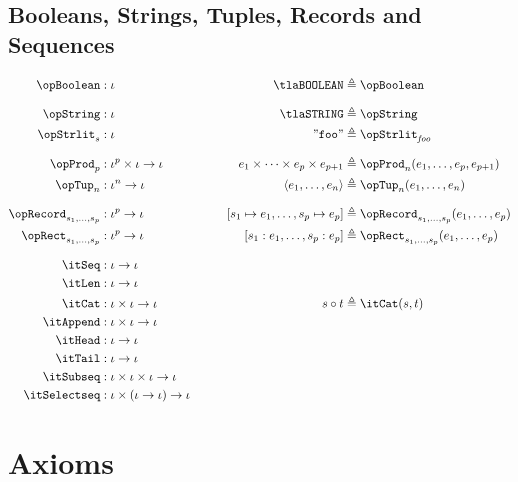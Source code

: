 \documentclass[11pt, a4paper, oneside]{article}
\begin{document}
    \subsection{Booleans, Strings, Tuples, Records and Sequences}

\begin{alignat*}{4}
    \opBoolean      &: \idv                                         &\qquad \tlaBOOLEAN             &\triangleq \opBoolean \\[7pt]
    \opString       &: \idv                                         &\qquad \tlaSTRING              &\triangleq \opString \\
    \opStrlit_s     &: \idv                                         &\qquad \mkstr{foo}             &\triangleq \opStrlit_{\mathit{foo}}\\[7pt]
    \opProd_p       &: \idv^p \times \idv \arr \idv                 &\qquad e_1 \times \cdots \times e_p \times e_{p+1}  &\triangleq \opProd_n(e_1, \dots, e_p, e_{p+1}) \\
    \opTup_n        &: \idv^n \arr \idv                             &\qquad \tup{ e_1, \dots, e_n } &\triangleq \opTup_n(e_1, \dots, e_n) \\[7pt]
    \opRecord_{s_1,\dots,s_p} &: \idv^p \arr \idv                   &\qquad \bx{ s_1 \mapsto e_1, \dots, s_p \mapsto e_p }  &\triangleq \opRecord_{s_1,\dots,s_p}(e_1, \dots, e_p) \\
    \opRect_{s_1,\dots,s_p}   &: \idv^p \arr \idv                   &\qquad \bx{ s_1 : e_1, \dots, s_p : e_p }  &\triangleq \opRect_{s_1,\dots,s_p}(e_1, \dots, e_p) \\[7pt]
    \itSeq          &: \idv \arr \idv \\
    \itLen          &: \idv \arr \idv \\
    \itCat          &: \idv \times \idv \arr \idv                   &\qquad s \circ t               &\triangleq \itCat(s, t) \\
    \itAppend       &: \idv \times \idv \arr \idv \\
    \itHead         &: \idv \arr \idv \\
    \itTail         &: \idv \arr \idv \\
    \itSubseq       &: \idv \times \idv \times \idv \arr \idv \\
    \itSelectseq    &: \idv \times (\idv \arr \idv) \arr \idv
\end{alignat*}


\newpage
\section{Axioms}
\label{sec:axioms}
\end{document}
